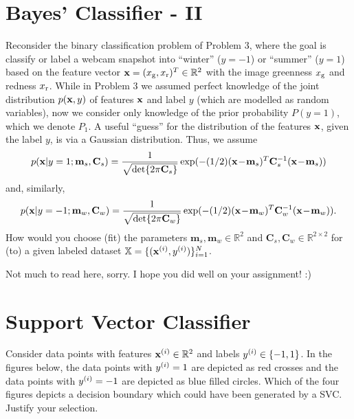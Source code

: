 \documentclass[article,11pt]{article}
\begin{document}



\newpage

\section{Bayes' Classifier - II}
Reconsider the binary classification problem of Problem 3, where the goal is classify or label a webcam snapshot into ``winter'' ($y=-1$) or ``summer'' ($y=1$) based on the feature vector 
${\bf x}=(x_{\rm g},x_{\rm r})^{T} \in \mathbb{R}^{2}$ with the image greenness $x_{\rm g}$ and redness $x_{\rm r}$. While in Problem 3 we assumed perfect knowledge 
of the joint distribution $p({\bf x},y)$ of features ${\bf x}$ and label $y$ (which are modelled as random variables), now we consider only knowledge of the prior probability $P(y=1)$, which we denote $P_{1}$. 
A useful ``guess'' for the distribution of the features ${\bf x}$, given the label $y$, is via a Gaussian distribution. Thus, we assume 
\begin{equation}
p({\bf x}|y=1;\mathbf{m}_{s},\mathbf{C}_{s}) = \frac{1}{\sqrt{\det\{ 2 \pi \mathbf{C}_{s} \}}} \exp(-(1/2) ({\bf x}\!-\!{\bf m}_{s})^{T} \mathbf{C}_{s}^{-1} ({\bf x}\!-\!{\bf m}_{s})) \nonumber
\end{equation}
and, similarly, 
\begin{equation}
p({\bf x}|y=-1;\mathbf{m}_{w},\mathbf{C}_{w}) = \frac{1}{\sqrt{\det\{ 2 \pi \mathbf{C}_{w} \}}} \exp(-(1/2) ({\bf x}\!-\!{\bf m}_{w})^{T} \mathbf{C}_{w}^{-1} ({\bf x}\!-\!{\bf m}_{w})).  \nonumber
\end{equation} 
How would you choose (fit) the parameters $\mathbf{m}_{s},\mathbf{m}_{w} \in \mathbb{R}^{2}$ and $\mathbf{C}_{s},\mathbf{C}_{w} \in \mathbb{R}^{2 \times 2}$ 
for (to) a given labeled dataset $\mathbb{X} = \{ ({\bf x}^{(i)},y^{(i)}) \}_{i=1}^{N}$.  



Not much to read here, sorry. I hope you did well on your assignment! :)


\newpage
\section{Support Vector Classifier}
Consider data points with features ${\bf x}^{(i)} \in \mathbb{R}^{2}$ and labels $y^{(i)} \in \{-1,1\}$. 
In the figures below, the data points with $y^{(i)}=1$ are depicted as red crosses 
and the data points with  $y^{(i)}=-1$ are depicted as blue filled circles. 
Which of the four figures depicts a decision boundary which could have been generated by a SVC. Justify your selection.
	
\end{document}
